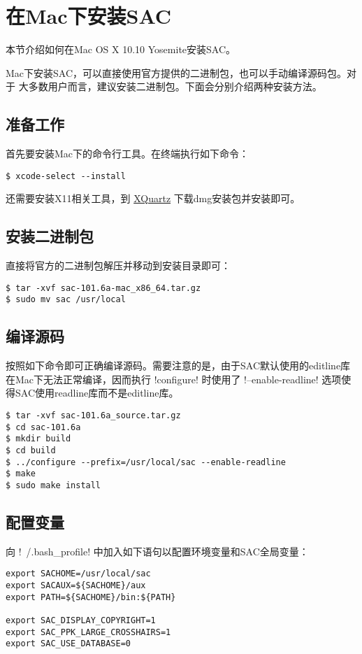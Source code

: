 \section{在Mac下安装SAC}
\label{sec:sac-install-for-mac}
本节介绍如何在Mac OS X 10.10 Yosemite安装SAC。

Mac下安装SAC，可以直接使用官方提供的二进制包，也可以手动编译源码包。对于
大多数用户而言，建议安装二进制包。下面会分别介绍两种安装方法。

\subsection{准备工作}
首先要安装Mac下的命令行工具。在终端执行如下命令：
\begin{verbatim}
$ xcode-select --install
\end{verbatim}
还需要安装X11相关工具，到 \href{http://xquartz.macosforge.org/landing/}{XQuartz}
下载dmg安装包并安装即可。

\subsection{安装二进制包}
直接将官方的二进制包解压并移动到安装目录即可：
\begin{verbatim}
$ tar -xvf sac-101.6a-mac_x86_64.tar.gz
$ sudo mv sac /usr/local
\end{verbatim}

\subsection{编译源码}
按照如下命令即可正确编译源码。需要注意的是，由于SAC默认使用的editline库
在Mac下无法正常编译，因而执行 !configure! 时使用了
!--enable-readline! 选项使得SAC使用readline库而不是editline库。
\begin{verbatim}
$ tar -xvf sac-101.6a_source.tar.gz
$ cd sac-101.6a
$ mkdir build
$ cd build
$ ../configure --prefix=/usr/local/sac --enable-readline
$ make
$ sudo make install
\end{verbatim}

\subsection{配置变量}
向 !~/.bash_profile! 中加入如下语句以配置环境变量和SAC全局变量：
\begin{verbatim}
export SACHOME=/usr/local/sac
export SACAUX=${SACHOME}/aux
export PATH=${SACHOME}/bin:${PATH}

export SAC_DISPLAY_COPYRIGHT=1
export SAC_PPK_LARGE_CROSSHAIRS=1
export SAC_USE_DATABASE=0
\end{verbatim}


